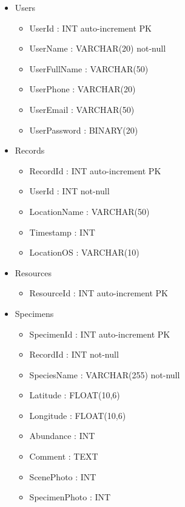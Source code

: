         \begin{itemize}
            \item Users
            \begin{itemize}
                \item UserId : INT auto-increment PK
                \item UserName : VARCHAR(20) not-null
                \item UserFullName : VARCHAR(50)
                \item UserPhone : VARCHAR(20)
                \item UserEmail : VARCHAR(50)
                \item UserPassword : BINARY(20)
            \end{itemize}
                
            \item Records
            \begin{itemize}
                \item RecordId : INT auto-increment PK
                \item UserId : INT not-null
                \item LocationName : VARCHAR(50)
                \item Timestamp : INT
                \item LocationOS : VARCHAR(10)
            \end{itemize}
                
            \item Resources
            \begin{itemize}
                \item ResourceId : INT auto-increment PK
            \end{itemize}

            \item Specimens
            \begin{itemize}
                \item SpecimenId : INT auto-increment PK
                \item RecordId : INT not-null
                \item SpeciesName : VARCHAR(255) not-null
                \item Latitude : FLOAT(10,6)
                \item Longitude : FLOAT(10,6)
                \item Abundance : INT
                \item Comment : TEXT
                \item ScenePhoto : INT
                \item SpecimenPhoto : INT   
            \end{itemize}
        \end{itemize}